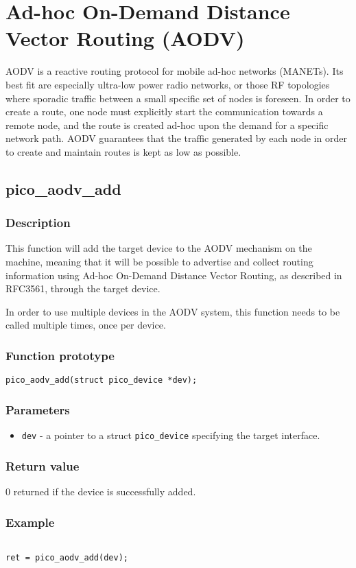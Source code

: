 \section{Ad-hoc On-Demand Distance Vector Routing (AODV)}


AODV is a reactive routing protocol for mobile ad-hoc networks
(MANETs). Its best fit are especially ultra-low power radio networks, 
or those RF topologies where sporadic traffic between a small specific set
of nodes is foreseen.
In order to create a route, one node must explicitly start the communication
towards a remote node, and the route is created ad-hoc upon the demand
for a specific network path.
AODV guarantees that the traffic generated by each node in order to create
and maintain routes is kept as low as possible.

\subsection{pico\_aodv\_add}

\subsubsection*{Description}
This function will add the target device to the AODV mechanism on the machine, 
meaning that it will be possible to advertise and collect routing information 
using Ad-hoc On-Demand Distance Vector Routing, as described in RFC3561, through the
target device.

In order to use multiple devices in the AODV system, this function needs to be called
multiple times, once per device.

\subsubsection*{Function prototype}
\texttt{pico\_aodv\_add(struct pico\_device *dev);}

\subsubsection*{Parameters}
\begin{itemize}[noitemsep]
\item \texttt{dev} - a pointer to a struct \texttt{pico\_device} specifying the target interface.
\end{itemize}

\subsubsection*{Return value}
0 returned if the device is successfully added.

\subsubsection*{Example}
\begin{verbatim}

ret = pico_aodv_add(dev);

\end{verbatim}

